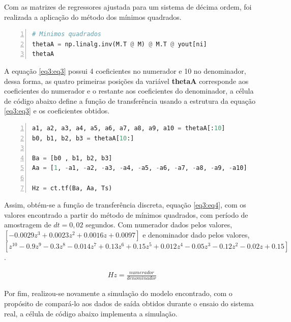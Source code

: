 Com as matrizes de regressores ajustada para um sistema de décima ordem, foi realizada a aplicação do método dos mínimos quadrados.

\vspace{0.5cm}

\begin{lstlisting}[language=python, numbers=left, label=py3, caption={Método dos mínimos quadrados.}]
# Minimos quadrados
thetaA = np.linalg.inv(M.T @ M) @ M.T @ yout[ni]
thetaA
\end{lstlisting}

A equação \ref{eq3:eq3} possui 4 coeficientes no numerador e 10 no denominador, dessa forma, as quatro primeiras posições da variável  \textbf{thetaA} corresponde aos coeficientes do numerador e o restante aos coeficientes do denominador, a célula de código abaixo define a função de transferência usando a estrutura da equação \ref{eq3:eq3} e os coeficientes obtidos.

\vspace{0.5cm}

\begin{lstlisting}[language=python, numbers=left, label=py3, caption={Salvando os coeficientes em variáveis e obtendo a função de transferência.}]
a1, a2, a3, a4, a5, a6, a7, a8, a9, a10 = thetaA[:10]
b0, b1, b2, b3 = thetaA[10:]

Ba = [b0 , b1, b2, b3]
Aa = [1, -a1, -a2, -a3, -a4, -a5, -a6, -a7, -a8, -a9, -a10]

Hz = ct.tf(Ba, Aa, Ts)
\end{lstlisting}

Assim, obtém-se a função de transferência discreta, equação \ref{eq3:eq4}, com os valores encontrado a partir do método de mínimos quadrados, com período de amostragem de $dt = 0,02$ segundos. Com numerador dados pelos valores, $[-0.0029 z^3 + 0.0023z^2 + 0.0016 z + 0.0097]$ e denominador dado pelos valores, $[z^{10} - 0.9 z^9 - 0.3 z^8 - 0.014 z^7 + 0.13 z^6 + 0.15 z^5 + 0.012 z^4 - 0.05 z^3 - 0.12 z^2 - 0.02 z + 0.15]$.

\begin{align}
Hz = \frac{numerador}{denominador} \label{eq3:eq4}
\end{align}

Por fim, realizou-se novamente a simulação do modelo encontrado, com o propósito de compará-lo aos dados de saída obtidos durante o ensaio do sistema real, a célula de código abaixo implementa a simulação.

\vspace{0.5cm}

